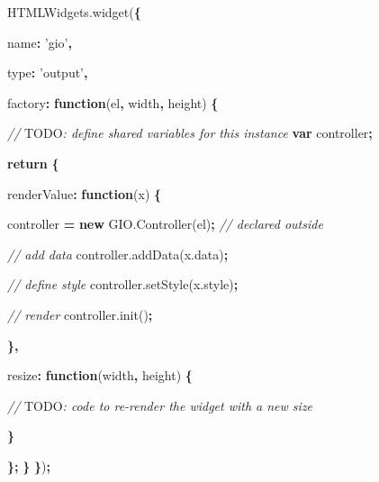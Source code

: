 \documentclass[10pt,]{krantz}
\makeatletter
\newenvironment{Shaded}{\begin{snugshade}}{\end{snugshade}}
\newcommand{\AlertTok}[1]{\textcolor[rgb]{0.33,0.33,0.33}{#1}}
\newcommand{\AttributeTok}[1]{\textcolor[rgb]{0.61,0.61,0.61}{#1}}
\newcommand{\CommentTok}[1]{\textcolor[rgb]{0.37,0.37,0.37}{\textit{#1}}}
\newcommand{\ControlFlowTok}[1]{\textcolor[rgb]{0.27,0.27,0.27}{\textbf{#1}}}
\newcommand{\DataTypeTok}[1]{\textcolor[rgb]{0.27,0.27,0.27}{#1}}
\newcommand{\KeywordTok}[1]{\textcolor[rgb]{0.27,0.27,0.27}{\textbf{#1}}}
\newcommand{\NormalTok}[1]{#1}
\newcommand{\OperatorTok}[1]{\textcolor[rgb]{0.43,0.43,0.43}{\textbf{#1}}}
\newcommand{\StringTok}[1]{\textcolor[rgb]{0.5,0.5,0.5}{#1}}
\newcommand{\VariableTok}[1]{\textcolor[rgb]{0,0,0}{#1}}
\newenvironment{kframe}{%
\medskip{}
\setlength{\fboxsep}{.8em}
 \def\at@end@of@kframe{}%
 \ifinner\ifhmode%
  \def\at@end@of@kframe{\end{minipage}}%
  \begin{minipage}{\columnwidth}%
 \fi\fi%
 \def\FrameCommand##1{\hskip\@totalleftmargin \hskip-\fboxsep
 \colorbox{shadecolor}{##1}\hskip-\fboxsep
     \hskip-\linewidth \hskip-\@totalleftmargin \hskip\columnwidth}%
 \MakeFramed {\advance\hsize-\width
   \@totalleftmargin\z@ \linewidth\hsize
   \@setminipage}}%
 {\par\unskip\endMakeFramed%
 \at@end@of@kframe}
\renewenvironment{Shaded}{\begin{kframe}}{\end{kframe}}
\makeatother
\begin{document}
\begin{Shaded}
\begin{Highlighting}[]
\VariableTok{HTMLWidgets}\NormalTok{.}\AttributeTok{widget}\NormalTok{(}\OperatorTok{\{}

  \DataTypeTok{name}\OperatorTok{:} \StringTok{'gio'}\OperatorTok{,}

  \DataTypeTok{type}\OperatorTok{:} \StringTok{'output'}\OperatorTok{,}

  \DataTypeTok{factory}\OperatorTok{:} \KeywordTok{function}\NormalTok{(el}\OperatorTok{,}\NormalTok{ width}\OperatorTok{,}\NormalTok{ height) }\OperatorTok{\{}

    \CommentTok{// }\AlertTok{TODO}\CommentTok{: define shared variables for this instance}
    \KeywordTok{var}\NormalTok{ controller}\OperatorTok{;}

    \ControlFlowTok{return} \OperatorTok{\{}

      \DataTypeTok{renderValue}\OperatorTok{:} \KeywordTok{function}\NormalTok{(x) }\OperatorTok{\{}

\NormalTok{        controller }\OperatorTok{=} \KeywordTok{new} \VariableTok{GIO}\NormalTok{.}\AttributeTok{Controller}\NormalTok{(el)}\OperatorTok{;} \CommentTok{// declared outside}
        
        \CommentTok{// add data}
        \VariableTok{controller}\NormalTok{.}\AttributeTok{addData}\NormalTok{(}\VariableTok{x}\NormalTok{.}\AttributeTok{data}\NormalTok{)}\OperatorTok{;}

        \CommentTok{// define style}
        \VariableTok{controller}\NormalTok{.}\AttributeTok{setStyle}\NormalTok{(}\VariableTok{x}\NormalTok{.}\AttributeTok{style}\NormalTok{)}\OperatorTok{;}

        \CommentTok{// render}
        \VariableTok{controller}\NormalTok{.}\AttributeTok{init}\NormalTok{()}\OperatorTok{;}

      \OperatorTok{\},}

      \DataTypeTok{resize}\OperatorTok{:} \KeywordTok{function}\NormalTok{(width}\OperatorTok{,}\NormalTok{ height) }\OperatorTok{\{}

        \CommentTok{// }\AlertTok{TODO}\CommentTok{: code to re-render the widget with a new size}

      \OperatorTok{\}}

    \OperatorTok{\};}
  \OperatorTok{\}}
\OperatorTok{\}}\NormalTok{)}\OperatorTok{;}
\end{Highlighting}
\end{Shaded}
\end{document}
